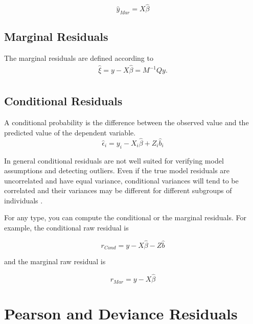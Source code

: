 \documentclass[12pt, a4paper]{report}
\theoremstyle{plain}
\theoremstyle{definition}
\theoremstyle{remark}
\begin{document}
\[ \hat{y}_{Mar} = X \hat{\beta} \]

\subsection{Marginal Residuals}
The marginal residuals are defined according to
\begin{eqnarray*}
	\hat{\xi} = y - X\hat{\beta} = M^{-1}Qy. \\\nonumber
\end{eqnarray*}


\subsection{Conditional Residuals}
A conditional probability is the difference between the observed value and the predicted value of the dependent variable.
\begin{equation*}
\hat{\epsilon}_{i} = y_{i} - X_{i}\hat{\beta} + Z_{i}\hat{b}_{i}
\end{equation*}

In general conditional residuals are not well suited for verifying model assumptions and detecting outliers. Even if the true model residuals are uncorrelated and have equal variance, conditional variances will tend to be correlated and their variances may be different for different subgroups of individuals \citep{west}.




For any type, you can compute the conditional or the marginal residuals. For example, the conditional raw residual is


\[ r_{Cond} = y - X \hat{\beta} - Z \hat{b} \]

and the marginal raw residual is



\[ r_{Mar} = y - X \hat{\beta} \]







\section{Pearson and Deviance Residuals} 
\end{document}
